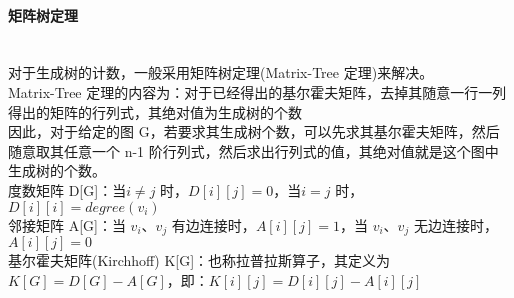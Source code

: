 \paragraph{矩阵树定理}~{}
\\
对于生成树的计数，一般采用矩阵树定理(Matrix-Tree 定理)来解决。
\\
Matrix-Tree 定理的内容为：对于已经得出的基尔霍夫矩阵，去掉其随意一行一列得出的矩阵的行列式，其绝对值为生成树的个数
\\
因此，对于给定的图 G，若要求其生成树个数，可以先求其基尔霍夫矩阵，然后随意取其任意一个 n-1 阶行列式，然后求出行列式的值，其绝对值就是这个图中生成树的个数。
\\
度数矩阵 D[G]：当$ i\neq j$ 时，$D[i][j]=0$，当$ i=j$ 时，$D[i][i] = degree(v_i)$
\\
邻接矩阵 A[G]：当 $v_i$、$v_j$ 有边连接时，$A[i][j]=1$，当 $v_i$、$v_j$ 无边连接时，$A[i][j]=0$
\\
基尔霍夫矩阵(Kirchhoff) K[G]：也称拉普拉斯算子，其定义为$K[G]=D[G]-A[G]$，即：$K[i][j]=D[i][j]-A[i][j]$
\\